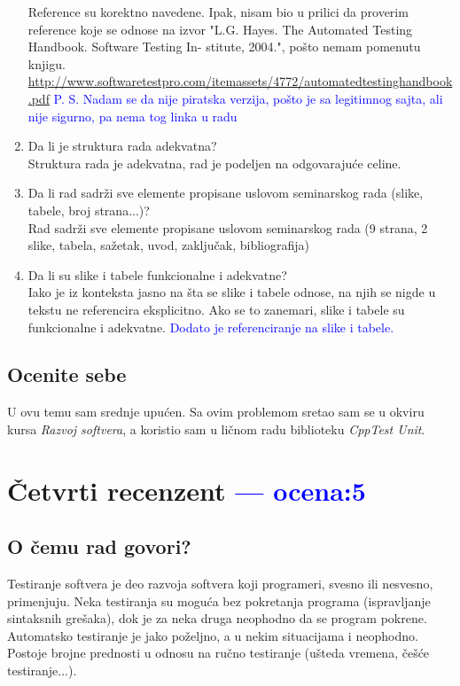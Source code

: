 \documentclass[a4paper]{report}
\newcommand{\odgovor}[1]{\textcolor{blue}{#1}}
\begin{document}
\begin{enumerate}
	Reference su korektno navedene. Ipak, nisam bio u prilici da proverim reference koje se odnose na izvor "L.G. Hayes. The Automated Testing Handbook. Software Testing In-
	stitute, 2004.", pošto nemam pomenutu knjigu.
\odgovor{\url{http://www.softwaretestpro.com/itemassets/4772/automatedtestinghandbook.pdf} P. S. Nadam se da nije piratska verzija, pošto je sa legitimnog sajta, ali nije sigurno, pa nema tog linka u radu}
\item Da li je struktura rada adekvatna?\\

	Struktura rada je adekvatna, rad je podeljen na odgovarajuće celine.
\item Da li rad sadrži sve elemente propisane uslovom seminarskog rada (slike, tabele, broj strana...)?\\

	Rad sadrži sve elemente propisane uslovom seminarskog rada (9 strana, 2 slike, tabela, sažetak, uvod, zaključak, bibliografija)
\item Da li su slike i tabele funkcionalne i adekvatne?\\

	Iako je iz konteksta jasno na šta se slike i tabele odnose, na njih se nigde u tekstu ne referencira eksplicitno. Ako se to zanemari, slike i tabele su funkcionalne i adekvatne. 
\odgovor{Dodato je referenciranje na slike i tabele.}
\end{enumerate}

\section{Ocenite sebe}
U ovu temu sam srednje upućen. Sa ovim problemom sretao sam se u okviru kursa \textit{Razvoj softvera}, a koristio sam u ličnom radu biblioteku \textit{CppTest Unit}.



\chapter{Četvrti recenzent \odgovor{--- ocena:5} }

\section{O čemu rad govori?}
Testiranje softvera je deo razvoja softvera koji programeri, svesno ili nesvesno, primenjuju. Neka testiranja su moguća bez pokretanja programa (ispravljanje sintaksnih grešaka), dok je za neka druga neophodno da se program pokrene. Automatsko testiranje je jako poželjno, a u nekim situacijama i neophodno. Postoje brojne prednosti u odnosu na ručno testiranje (ušteda vremena, češće testiranje...).
\\
\end{document}
